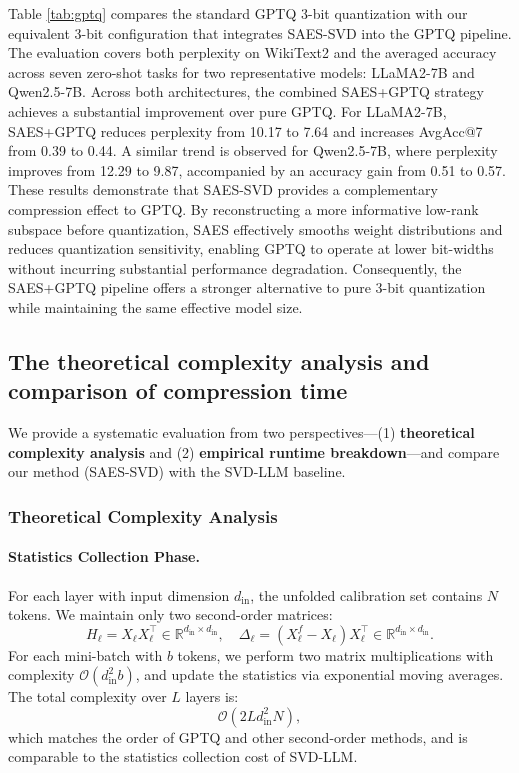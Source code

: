 Table \ref{tab:gptq} compares the standard GPTQ 3-bit quantization with our equivalent 3-bit configuration that integrates SAES-SVD into the GPTQ pipeline. The evaluation covers both perplexity on WikiText2 and the averaged accuracy across seven zero-shot tasks for two representative models: LLaMA2-7B and Qwen2.5-7B.
Across both architectures, the combined SAES+GPTQ strategy achieves a substantial improvement over pure GPTQ. For LLaMA2-7B, SAES+GPTQ reduces perplexity from 10.17 to 7.64 and increases AvgAcc@7 from 0.39 to 0.44. A similar trend is observed for Qwen2.5-7B, where perplexity improves from 12.29 to 9.87, accompanied by an accuracy gain from 0.51 to 0.57.
These results demonstrate that SAES-SVD provides a complementary compression effect to GPTQ. By reconstructing a more informative low-rank subspace before quantization, SAES effectively smooths weight distributions and reduces quantization sensitivity, enabling GPTQ to operate at lower bit-widths without incurring substantial performance degradation. Consequently, the SAES+GPTQ pipeline offers a stronger alternative to pure 3-bit quantization while maintaining the same effective model size.




\subsection{The theoretical complexity analysis and comparison of compression time}

We provide a systematic evaluation from two perspectives—(1) \textbf{theoretical complexity analysis} and (2) \textbf{empirical runtime breakdown}—and compare our method (SAES-SVD) with the SVD-LLM baseline.

\subsubsection{Theoretical Complexity Analysis}

\paragraph{Statistics Collection Phase.}
For each layer with input dimension $d_{\mathrm{in}}$, the unfolded calibration set contains $N$ tokens. We maintain only two second-order matrices:
\[
H_\ell = X_\ell X_\ell^\top \in \mathbb{R}^{d_{\mathrm{in}} \times d_{\mathrm{in}}}, 
\quad
\Delta_\ell = (X_\ell^f - X_\ell) X_\ell^\top \in \mathbb{R}^{d_{\mathrm{in}} \times d_{\mathrm{in}}}.
\]
For each mini-batch with $b$ tokens, we perform two matrix multiplications with complexity $\mathcal{O}(d_{\mathrm{in}}^2 b)$, and update the statistics via exponential moving averages. The total complexity over $L$ layers is:
\[
\mathcal{O}\!\left( 2 L d_{\mathrm{in}}^2 N \right),
\]
which matches the order of GPTQ and other second-order methods, and is comparable to the statistics collection cost of SVD-LLM.

